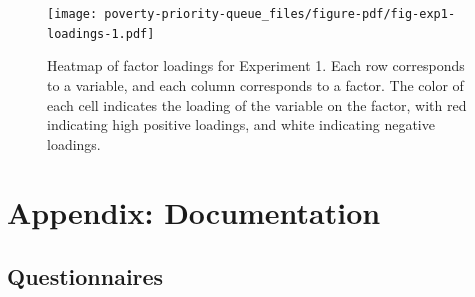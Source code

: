 \documentclass[
]{article}
\begin{document}
\begin{figure}

{\centering \texttt{[image: poverty-priority-queue\_files/figure-pdf/fig-exp1-loadings-1.pdf]}

}

\caption{\label{fig-exp1-loadings}Heatmap of factor loadings for
Experiment 1. Each row corresponds to a variable, and each column
corresponds to a factor. The color of each cell indicates the loading of
the variable on the factor, with red indicating high positive loadings,
and white indicating negative loadings.}

\end{figure}

\hypertarget{appendix-documentation}{%
\section{Appendix: Documentation}\label{appendix-documentation}}

\hypertarget{sec-questionnaires}{%
\subsection{Questionnaires}\label{sec-questionnaires}}
\end{document}
